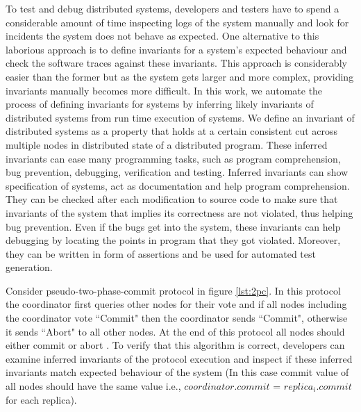 To test and debug distributed systems, developers and testers have to spend a considerable amount of time inspecting logs of the system manually and look for incidents the system does not behave as 
expected. One alternative to this laborious approach is to define invariants for a system's expected behaviour and check the software traces against these invariants. This approach is considerably easier than the former but as the system gets larger and more 
complex, providing invariants manually becomes more difficult. In this work, we automate the process of defining invariants for systems by inferring likely invariants of distributed systems from run time execution of systems. We define an invariant of distributed systems as a property that holds at a certain consistent cut across multiple nodes in distributed state of a distributed program. These inferred invariants can ease many programming tasks, such as program comprehension, bug prevention, debugging, verification and testing. Inferred invariants can show specification of systems,  act as documentation and help program comprehension. They can be checked after each modification to source code to make sure that invariants of the system that implies its correctness are not violated, thus helping bug prevention. Even if the bugs get into the system, these invariants can help debugging by locating the points in program that they got violated. Moreover, they can be written in form of assertions and be used for automated test generation. 





Consider pseudo-two-phase-commit protocol in figure \ref{lst:2pc}. In this protocol the coordinator first queries other nodes for their vote and if all nodes including the coordinator vote ``Commit" then the coordinator sends ``Commit", otherwise it sends ``Abort" to all other nodes. At the end of this protocol all nodes should either commit or abort . To verify that this algorithm is correct, developers can examine inferred invariants of the protocol execution and inspect if these inferred invariants match expected behaviour of the system (In this case commit value of all nodes should have the same value i.e., $coordinator.commit$ = $replica_i .commit$ for each replica).


